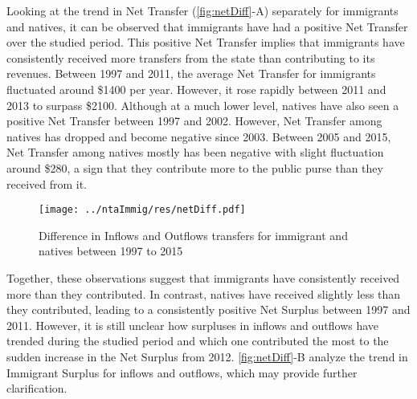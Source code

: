 \vspace{0.7em}\par
Looking at the trend in Net Transfer (\autoref{fig:netDiff}-A) separately for immigrants and natives, it can be observed that immigrants have had a positive Net Transfer over the studied period.
This positive Net Transfer implies that immigrants have consistently received more transfers from the state than contributing to its revenues.
Between 1997 and 2011, the average Net Transfer for immigrants fluctuated around \$1400 per year.
However, it rose rapidly between 2011 and 2013 to surpass \$2100.
Although at a much lower level, natives have also seen a positive Net Transfer between 1997 and 2002.
However, Net Transfer among natives has dropped and become negative since 2003.
Between 2005 and 2015, Net Transfer among natives mostly has been negative with slight fluctuation around \$280, a sign that they contribute more to the public purse than they received from it.

  \begin{figure}[H]%
    \caption{Difference in Inflows and Outflows transfers for immigrant and natives between 1997 to 2015}
    \texttt{[image: ../ntaImmig/res/netDiff.pdf]}%
    \label{fig:netDiff}%
  \end{figure}%

\vspace{0.7em}\par
Together, these observations suggest that immigrants have consistently received more than they contributed.
In contrast, natives have received slightly less than they contributed, leading to a consistently positive Net Surplus between 1997 and 2011.
However, it is still unclear how surpluses in inflows and outflows have trended during the studied period and which one contributed the most to the sudden increase in the Net Surplus from 2012.
\autoref{fig:netDiff}-B analyze the trend in Immigrant Surplus for inflows and outflows, which may provide further clarification.

